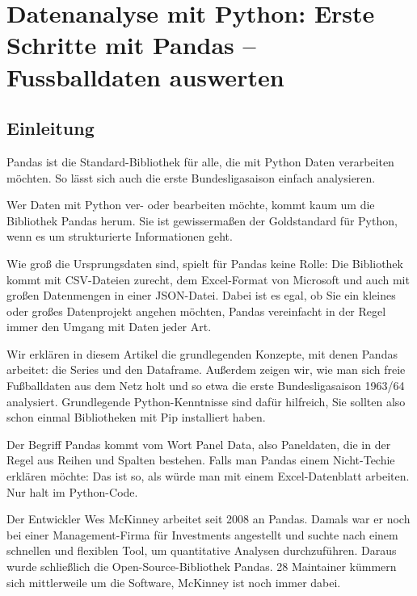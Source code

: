 %
%
%
%



\chapter{Datenanalyse mit Python: Erste Schritte mit Pandas – Fussballdaten auswerten}

\section{Einleitung}

Pandas ist die Standard-Bibliothek für alle, die mit Python Daten verarbeiten möchten. So lässt sich auch die erste Bundesligasaison einfach analysieren.


Wer Daten mit Python ver- oder bearbeiten möchte, kommt kaum um die Bibliothek Pandas herum. Sie ist gewissermaßen der Goldstandard für Python, wenn es um strukturierte Informationen geht.

Wie groß die Ursprungsdaten sind, spielt für Pandas keine Rolle: Die Bibliothek kommt mit CSV-Dateien zurecht, dem Excel-Format von Microsoft und auch mit großen Datenmengen in einer JSON-Datei. Dabei ist es egal, ob Sie ein kleines oder großes Datenprojekt angehen möchten, Pandas vereinfacht in der Regel immer den Umgang mit Daten jeder Art.


Wir erklären in diesem Artikel die grundlegenden Konzepte, mit denen Pandas arbeitet: die Series und den Dataframe. Außerdem zeigen wir, wie man sich freie Fußballdaten aus dem Netz holt und so etwa die erste Bundesligasaison 1963/64 analysiert. Grundlegende Python-Kenntnisse sind dafür hilfreich, Sie sollten also schon einmal Bibliotheken mit Pip installiert haben.

Der Begriff Pandas kommt vom Wort Panel Data, also Paneldaten, die in der Regel aus Reihen und Spalten bestehen. Falls man Pandas einem Nicht-Techie erklären möchte: Das ist so, als würde man mit einem Excel-Datenblatt arbeiten. Nur halt im Python-Code.

Der Entwickler Wes McKinney arbeitet seit 2008 an Pandas. Damals war er noch bei einer Management-Firma für Investments angestellt und suchte nach einem schnellen und flexiblen Tool, um quantitative Analysen durchzuführen. Daraus wurde schließlich die Open-Source-Bibliothek Pandas. 28 Maintainer kümmern sich mittlerweile um die Software, McKinney ist noch immer dabei.

